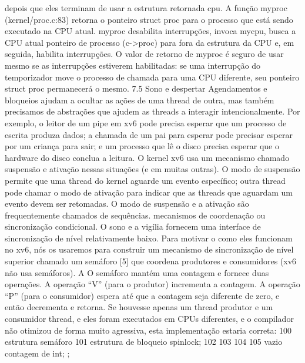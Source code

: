  depois  que  eles  terminam  de  usar  a  estrutura  retornada  cpu.
 A  função  myproc  (kernel/proc.c:83)  retorna  o  ponteiro  struct  proc  para  o  processo  que
 está  sendo  executado  na  CPU  atual.  myproc  desabilita  interrupções,  invoca  mycpu,  busca  a  CPU  atual
 ponteiro  de  processo  (c->proc)  para  fora  da  estrutura  da  CPU  e,  em  seguida,  habilita  interrupções.  O  valor  de  retorno
 de  myproc  é  seguro  de  usar  mesmo  se  as  interrupções  estiverem  habilitadas:  se  uma  interrupção  do  temporizador  move  o  processo  de  chamada
 para  uma  CPU  diferente,  seu  ponteiro  struct  proc  permanecerá  o  mesmo.
 7.5  Sono  e  despertar
 Agendamentos  e  bloqueios  ajudam  a  ocultar  as  ações  de  uma  thread  de  outra,  mas  também  precisamos  de  abstrações  que  
ajudem  as  threads  a  interagir  intencionalmente.  Por  exemplo,  o  leitor  de  um  pipe  em  xv6  pode
 precisa  esperar  que  um  processo  de  escrita  produza  dados;  a  chamada  de  um  pai  para  esperar  pode  precisar  esperar  por  um
 criança  para  sair;  e  um  processo  que  lê  o  disco  precisa  esperar  que  o  hardware  do  disco  conclua  a  leitura.
 O  kernel  xv6  usa  um  mecanismo  chamado  suspensão  e  ativação  nessas  situações  (e  em  muitas  outras).
 O  modo  de  suspensão  permite  que  uma  thread  do  kernel  aguarde  um  evento  específico;  outra  thread  pode  chamar  o  modo  de  ativação  para  indicar  
que  as  threads  que  aguardam  um  evento  devem  ser  retomadas.  O  modo  de  suspensão  e  a  ativação  são  frequentemente  chamados  de  sequências.
 mecanismos  de  coordenação  ou  sincronização  condicional.
 O  sono  e  a  vigília  fornecem  uma  interface  de  sincronização  de  nível  relativamente  baixo.  Para  motivar  o
 como  eles  funcionam  no  xv6,  nós  os  usaremos  para  construir  um  mecanismo  de  sincronização  de  nível  superior  chamado
 um  semáforo  [5]  que  coordena  produtores  e  consumidores  (xv6  não  usa  semáforos).  A
 O  semáforo  mantém  uma  contagem  e  fornece  duas  operações.  A  operação  “V”  (para  o  produtor)
 incrementa  a  contagem.  A  operação  “P”  (para  o  consumidor)  espera  até  que  a  contagem  seja  diferente  de  zero,
 e  então  decrementa  e  retorna.  Se  houvesse  apenas  um  thread  produtor  e  um  consumidor
 thread,  e  eles  foram  executados  em  CPUs  diferentes,  e  o  compilador  não  otimizou  de  forma  muito  agressiva,
 esta  implementação  estaria  correta:
 100  estrutura  semáforo  {
 101  estrutura  de  bloqueio  spinlock;
 102
 103
 104
 105  vazio
 contagem  de  int;
 };
